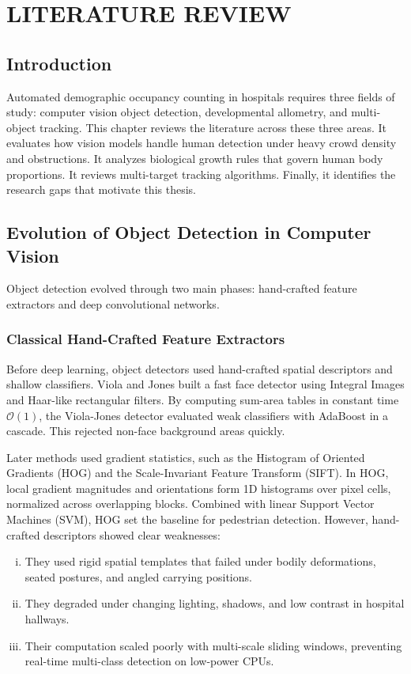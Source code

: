 \chapter{LITERATURE REVIEW}

\section{Introduction}
Automated demographic occupancy counting in hospitals requires three fields of study: computer vision object detection, developmental allometry, and multi-object tracking. This chapter reviews the literature across these three areas. It evaluates how vision models handle human detection under heavy crowd density and obstructions. It analyzes biological growth rules that govern human body proportions. It reviews multi-target tracking algorithms. Finally, it identifies the research gaps that motivate this thesis.

\section{Evolution of Object Detection in Computer Vision}
Object detection evolved through two main phases: hand-crafted feature extractors and deep convolutional networks.

\subsection{Classical Hand-Crafted Feature Extractors}
Before deep learning, object detectors used hand-crafted spatial descriptors and shallow classifiers. Viola and Jones \cite{viola2001} built a fast face detector using Integral Images and Haar-like rectangular filters. By computing sum-area tables in constant time $\mathcal{O}(1)$, the Viola-Jones detector evaluated weak classifiers with AdaBoost in a cascade. This rejected non-face background areas quickly.

Later methods used gradient statistics, such as the Histogram of Oriented Gradients (HOG) and the Scale-Invariant Feature Transform (SIFT). In HOG, local gradient magnitudes and orientations form 1D histograms over pixel cells, normalized across overlapping blocks. Combined with linear Support Vector Machines (SVM), HOG set the baseline for pedestrian detection. However, hand-crafted descriptors showed clear weaknesses:
\begin{enumerate}[(i)]
    \item They used rigid spatial templates that failed under bodily deformations, seated postures, and angled carrying positions.
    \item They degraded under changing lighting, shadows, and low contrast in hospital hallways.
    \item Their computation scaled poorly with multi-scale sliding windows, preventing real-time multi-class detection on low-power CPUs.
\end{enumerate}

